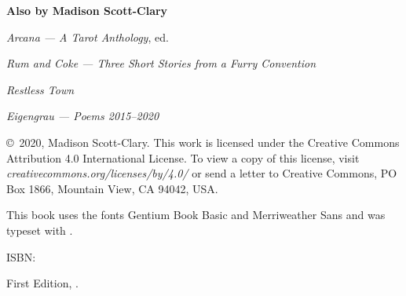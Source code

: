
\thispagestyle{empty}
\null
\vfill
\begin{center}
    \noindent\textbf{Also by Madison Scott-Clary}

    \emph{Arcana --- A Tarot Anthology}, ed.

    \emph{Rum and Coke --- Three Short Stories from a Furry Convention}

    \emph{Restless Town}

    \emph{Eigengrau --- Poems 2015--2020}
\end{center}
\vfill
\singlespacing
{\small\parindent0pt\parskip5pt
\noindent \copyright\ 2020, Madison Scott-Clary. This work is licensed under the Creative Commons Attribution 4.0 International License. To view a copy of this license, visit \mbox{\emph{creativecommons.org/licenses/by/4.0/}} or send a letter to Creative Commons, PO Box 1866, Mountain View, CA 94042, USA.

This book uses the fonts Gentium Book Basic and  {\allyFont Merriweather Sans} and was typeset with {\XeLaTeX}.

\vspace{1ex}

ISBN: \ISBN


\vspace{1ex}

\emph{\Title}

\vspace{1ex}

First Edition, \Year.

\EditionsList
}

\cleardoublepage
